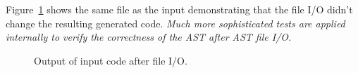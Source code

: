    Figure~\ref{Tutorial:exampleOutput_astFileIOSource}
shows the same file as the input demonstrating that the file I/O
didn't change the resulting generated code.  
{\em Much more sophisticated tests are applied internally to verify 
the correctness of the AST after AST file I/O.}

\begin{figure}[!h]
{\indent
{\mySmallFontSize

\begin{latexonly}
   
\end{latexonly}

\begin{htmlonly}
   
\end{htmlonly}

}
}
\caption{Output of input code after file I/O.}
\label{Tutorial:exampleOutput_astFileIOSource}
\end{figure}







